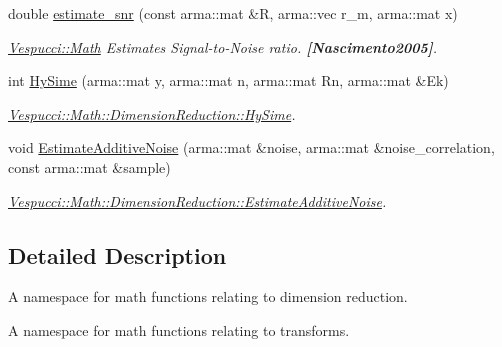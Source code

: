\begin{DoxyCompactItemize}
double \hyperlink{namespace_vespucci_1_1_math_1_1_dimension_reduction_a37f3a4278bbdfba337f4e776f7d0916b}{estimate\+\_\+snr} (const arma\+::mat \&R, arma\+::vec r\+\_\+m, arma\+::mat x)
\begin{DoxyCompactList}\small\item\em \hyperlink{namespace_vespucci_1_1_math}{Vespucci\+::\+Math} Estimates Signal-\/to-\/\+Noise ratio. {\bfseries [Nascimento2005]}. \end{DoxyCompactList}\item 
int \hyperlink{namespace_vespucci_1_1_math_1_1_dimension_reduction_a355295f13e2a14e990b22eb96a33db5c}{Hy\+Sime} (arma\+::mat y, arma\+::mat n, arma\+::mat Rn, arma\+::mat \&Ek)
\begin{DoxyCompactList}\small\item\em \hyperlink{namespace_vespucci_1_1_math_1_1_dimension_reduction_a355295f13e2a14e990b22eb96a33db5c}{Vespucci\+::\+Math\+::\+Dimension\+Reduction\+::\+Hy\+Sime}. \end{DoxyCompactList}\item 
void \hyperlink{namespace_vespucci_1_1_math_1_1_dimension_reduction_ac96e3dc096295499724e3ecbb63a3f57}{Estimate\+Additive\+Noise} (arma\+::mat \&noise, arma\+::mat \&noise\+\_\+correlation, const arma\+::mat \&sample)
\begin{DoxyCompactList}\small\item\em \hyperlink{namespace_vespucci_1_1_math_1_1_dimension_reduction_ac96e3dc096295499724e3ecbb63a3f57}{Vespucci\+::\+Math\+::\+Dimension\+Reduction\+::\+Estimate\+Additive\+Noise}. \end{DoxyCompactList}\end{DoxyCompactItemize}


\subsection{Detailed Description}
A namespace for math functions relating to dimension reduction. 

A namespace for math functions relating to transforms. 

